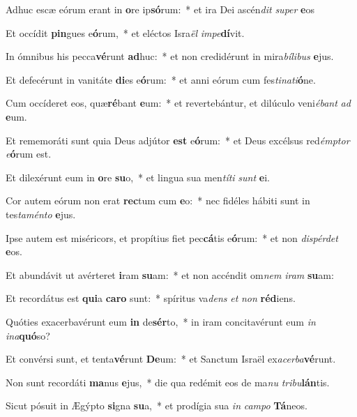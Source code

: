 \item Adhuc escæ eórum erant in \textbf{o}re ip\textbf{só}rum:~* et ira Dei ascén\textit{dit} \textit{su}\textit{per} \textbf{e}os
\item Et occídit \textbf{pin}gues e\textbf{ó}rum,~* et eléctos Isra\textit{ël} \textit{im}\textit{pe}\textbf{dí}vit.
\item In ómnibus his pecca\textbf{vé}runt \textbf{ad}huc:~* et non credidérunt in mira\textit{bí}\textit{li}\textit{bus} \textbf{e}jus.
\item Et defecérunt in vanitáte \textbf{di}es e\textbf{ó}rum:~* et anni eórum cum fes\textit{ti}\textit{na}\textit{ti}\textbf{ó}ne.
\item Cum occíderet eos, quæ\textbf{ré}bant \textbf{e}um:~* et revertebántur, et dilúculo veni\textit{é}\textit{bant} \textit{ad} \textbf{e}um.
\item Et rememoráti sunt quia Deus adjútor \textbf{est} e\textbf{ó}rum:~* et Deus excélsus red\textit{émp}\textit{tor} \textit{e}\textbf{ó}rum est.
\item Et dilexérunt eum in \textbf{o}re \textbf{su}o,~* et lingua sua men\textit{tí}\textit{ti} \textit{sunt} \textbf{e}i.
\item Cor autem eórum non erat \textbf{rec}tum cum \textbf{e}o:~* nec fidéles hábiti sunt in tes\textit{ta}\textit{mén}\textit{to} \textbf{e}jus.
\item Ipse autem est miséricors, et propítius fiet pec\textbf{cá}tis e\textbf{ó}rum:~* et non \textit{dis}\textit{pér}\textit{det} \textbf{e}os.
\item Et abundávit ut avérteret \textbf{i}ram \textbf{su}am:~* et non accéndit om\textit{nem} \textit{i}\textit{ram} \textbf{su}am:
\item Et recordátus est \textbf{qui}a \textbf{ca}\textbf{ro} sunt:~* spíritus va\textit{dens} \textit{et} \textit{non} \textbf{réd}iens.
\item Quóties exacerbavérunt eum \textbf{in} de\textbf{sér}to,~* in iram concitavérunt eum \textit{in} \textit{in}\textit{a}\textbf{quó}so?
\item Et convérsi sunt, et tenta\textbf{vé}runt \textbf{De}um:~* et Sanctum Israël ex\textit{a}\textit{cer}\textit{ba}\textbf{vé}runt.
\item Non sunt recordáti \textbf{ma}nus \textbf{e}jus,~* die qua redémit eos de ma\textit{nu} \textit{tri}\textit{bu}\textbf{lán}tis.
\item Sicut pósuit in Ægýpto \textbf{si}gna \textbf{su}a,~* et prodígia sua \textit{in} \textit{cam}\textit{po} \textbf{Tá}neos.
